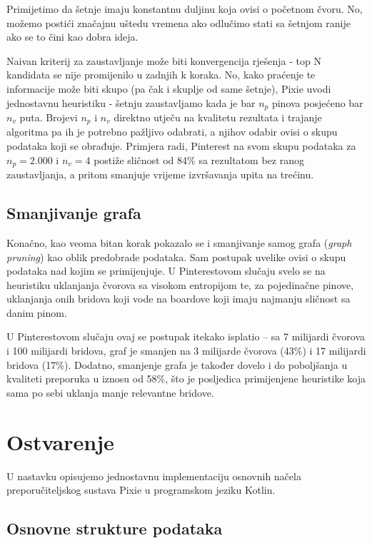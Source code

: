 \documentclass[times, utf8, seminar]{fer}
\begin{document}
Primijetimo da šetnje imaju konstantnu duljinu koja ovisi o početnom čvoru. No, možemo postići značajnu uštedu vremena ako odlučimo stati sa šetnjom ranije ako se to čini kao dobra ideja.

Naivan kriterij za zaustavljanje može biti konvergencija rješenja - top N kandidata se nije promijenilo u zadnjih k koraka. No, kako praćenje te informacije može biti skupo (pa čak i skuplje od same šetnje), Pixie uvodi jednostavnu heuristiku - šetnju zaustavljamo kada je bar $n_p$ pinova posjećeno bar $n_v$ puta. Brojevi $n_p$ i $n_v$ direktno utječu na kvalitetu rezultata i trajanje algoritma pa ih je potrebno pažljivo odabrati, a njihov odabir ovisi o skupu podataka koji se obrađuje. Primjera radi, Pinterest na svom skupu podataka za $n_p=2.000$ i $n_v=4$ postiže sličnost od 84\% sa rezultatom bez ranog zaustavljanja, a pritom smanjuje vrijeme izvršavanja upita na trećinu.

\section{Smanjivanje grafa}

Konačno, kao veoma bitan korak pokazalo se i smanjivanje samog grafa (\textit{graph pruning}) kao oblik predobrade podataka. Sam postupak uvelike ovisi o skupu podataka nad kojim se primijenjuje. U Pinterestovom slučaju svelo se na heuristiku uklanjanja čvorova sa visokom entropijom te, za pojedinačne pinove, uklanjanja onih bridova koji vode na boardove koji imaju najmanju sličnost sa danim pinom.

U Pinterestovom slučaju ovaj se postupak itekako isplatio -- sa 7 milijardi čvorova i 100 milijardi bridova, graf je smanjen na 3 milijarde čvorova (43\%) i 17 milijardi bridova (17\%). Dodatno, smanjenje grafa je također dovelo i do poboljšanja u kvaliteti preporuka u iznosu od 58\%, što je posljedica primijenjene heuristike koja sama po sebi uklanja manje relevantne bridove.

\chapter{Ostvarenje}

U nastavku opisujemo jednostavnu implementaciju osnovnih načela preporučiteljskog sustava Pixie u programskom jeziku Kotlin.

\section{Osnovne strukture podataka}
\end{document}
